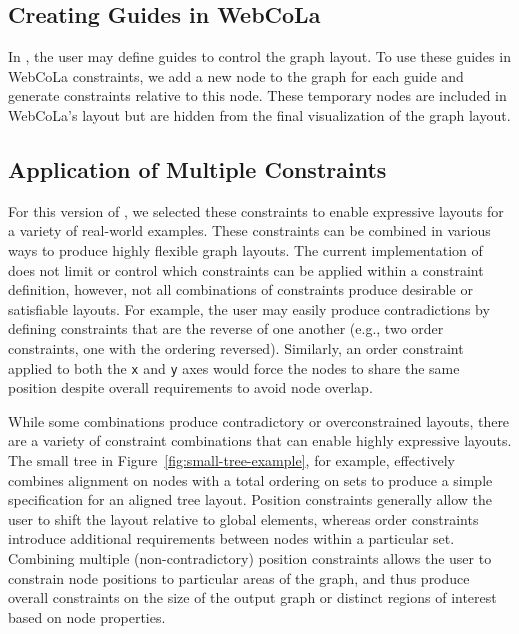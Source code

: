 \subsection{Creating Guides in WebCoLa}

In \projectname, the user may define guides to control the graph layout.
To use these guides in WebCoLa constraints, we add a new node to the graph
for each guide and generate constraints relative to this node. These 
temporary nodes are included in WebCoLa's layout but are hidden from the
final visualization of the graph layout.

\subsection{Application of Multiple Constraints}
\syphilisLayout
\syphilisSpec
For this version of \projectname, we selected these constraints to enable
expressive layouts for a variety of real-world examples. These constraints
can be combined in various ways to produce highly flexible graph layouts.
The current implementation of \projectname does not limit or control which
constraints can be applied within a constraint definition, however, not
all combinations of constraints produce desirable or satisfiable layouts.
For example, the user may easily produce contradictions by defining constraints
that are the reverse of one another (e.g., two order constraints, one with the
ordering reversed). Similarly, an order constraint applied to both the \texttt{x}
and \texttt{y} axes would force the nodes to share the same position despite
overall requirements to avoid node overlap. 

While some combinations produce contradictory or overconstrained layouts,
there are a variety of constraint combinations that can enable highly 
expressive layouts. The small tree in Figure~\ref{fig:small-tree-example}, for 
example, effectively combines alignment on nodes with a total ordering on sets 
to produce a simple specification for an aligned tree layout. Position constraints
generally allow the user to shift the layout relative to global elements,
whereas order constraints introduce additional requirements between nodes
within a particular set. Combining multiple (non-contradictory) position
constraints allows the user to constrain node positions to particular
areas of the graph, and thus produce overall constraints on the size of the
output graph or distinct regions of interest based on node properties.

